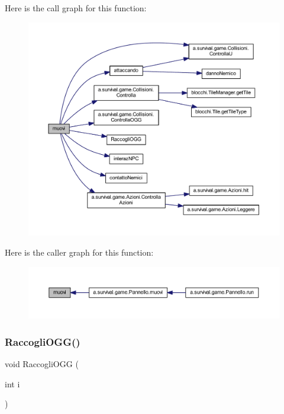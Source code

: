 Here is the call graph for this function\+:
\nopagebreak
\begin{figure}[H]
\begin{center}
\leavevmode
\includegraphics[width=350pt]{class_entita_1_1_giocatore_a1fe2f184b3cc7345c6a0f08d183a1d0b_cgraph}
\end{center}
\end{figure}
Here is the caller graph for this function\+:
\nopagebreak
\begin{figure}[H]
\begin{center}
\leavevmode
\includegraphics[width=350pt]{class_entita_1_1_giocatore_a1fe2f184b3cc7345c6a0f08d183a1d0b_icgraph}
\end{center}
\end{figure}
\mbox{\label{class_entita_1_1_giocatore_a9ba65e7d25928d62218cf14bee3c0273}} 
\subsubsection{\texorpdfstring{Raccogli\+O\+G\+G()}{RaccogliOGG()}}
{\footnotesize\ttfamily void Raccogli\+O\+GG (\begin{DoxyParamCaption}\item[{int}]{i }\end{DoxyParamCaption})}



